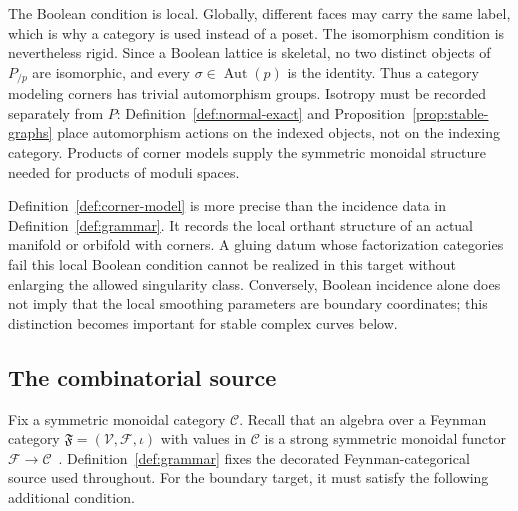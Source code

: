 \documentclass[11pt,letterpaper,twoside]{article}
\theoremstyle{plain}
\theoremstyle{definition}
\theoremstyle{remark}
\let\cite\citep
\begin{document}
The Boolean condition is local.  Globally, different faces may carry the same label, which is why a category is used instead of a poset.  The isomorphism condition is nevertheless rigid.  Since a Boolean lattice is skeletal, no two distinct objects of \(P_{/p}\) are isomorphic, and every \(\sigma\in\operatorname{Aut}(p)\) is the identity.  Thus a category modeling corners has trivial automorphism groups.  Isotropy must be recorded separately from \(P\): Definition~\ref{def:normal-exact} and Proposition~\ref{prop:stable-graphs} place automorphism actions on the indexed objects, not on the indexing category.  Products of corner models supply the symmetric monoidal structure needed for products of moduli spaces.

Definition~\ref{def:corner-model} is more precise than the incidence data in Definition~\ref{def:grammar}.  It records the local orthant structure of an actual manifold or orbifold with corners.  A gluing datum whose factorization categories fail this local Boolean condition cannot be realized in this target without enlarging the allowed singularity class.  Conversely, Boolean incidence alone does not imply that the local smoothing parameters are boundary coordinates; this distinction becomes important for stable complex curves below.

\subsection{The combinatorial source}

Fix a symmetric monoidal category \(\mathcal C\).  Recall that an algebra over a Feynman category \(\mathfrak F=(\mathcal V,\mathcal F,\iota)\) with values in \(\mathcal C\) is a strong symmetric monoidal functor \(\mathcal F\to\mathcal C\)~\cite{kaufmannward2017}.  Definition~\ref{def:grammar} fixes the decorated Feynman-categorical source used throughout.  For the boundary target, it must satisfy the following additional condition.
\end{document}

